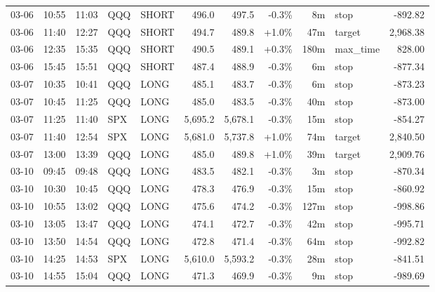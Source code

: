 \documentclass[11pt,a4paper,twoside]{article}
\begin{document}
\begin{center}
\begin{longtable}{>{\color{txtmain}}l l l l l r r r r >{\color{txtmain}}l r}
03-06 & 10:55 & 11:03 & QQQ & SHORT & 496.0 & 497.5 & \textcolor{lossred}{-0.3\%} & 8m & stop & \textcolor{lossred}{-892.82} \\
03-06 & 11:40 & 12:27 & QQQ & SHORT & 494.7 & 489.8 & \textcolor{wingreen}{+1.0\%} & 47m & target & \textcolor{wingreen}{2,968.38} \\
03-06 & 12:35 & 15:35 & QQQ & SHORT & 490.5 & 489.1 & \textcolor{wingreen}{+0.3\%} & 180m & max\_time & \textcolor{wingreen}{828.00} \\
03-06 & 15:45 & 15:51 & QQQ & SHORT & 487.4 & 488.9 & \textcolor{lossred}{-0.3\%} & 6m & stop & \textcolor{lossred}{-877.34} \\
03-07 & 10:35 & 10:41 & QQQ & LONG & 485.1 & 483.7 & \textcolor{lossred}{-0.3\%} & 6m & stop & \textcolor{lossred}{-873.23} \\
03-07 & 10:45 & 11:25 & QQQ & LONG & 485.0 & 483.5 & \textcolor{lossred}{-0.3\%} & 40m & stop & \textcolor{lossred}{-873.00} \\
03-07 & 11:25 & 11:40 & SPX & LONG & 5,695.2 & 5,678.1 & \textcolor{lossred}{-0.3\%} & 15m & stop & \textcolor{lossred}{-854.27} \\
03-07 & 11:40 & 12:54 & SPX & LONG & 5,681.0 & 5,737.8 & \textcolor{wingreen}{+1.0\%} & 74m & target & \textcolor{wingreen}{2,840.50} \\
03-07 & 13:00 & 13:39 & QQQ & LONG & 485.0 & 489.8 & \textcolor{wingreen}{+1.0\%} & 39m & target & \textcolor{wingreen}{2,909.76} \\
03-10 & 09:45 & 09:48 & QQQ & LONG & 483.5 & 482.1 & \textcolor{lossred}{-0.3\%} & 3m & stop & \textcolor{lossred}{-870.34} \\
03-10 & 10:30 & 10:45 & QQQ & LONG & 478.3 & 476.9 & \textcolor{lossred}{-0.3\%} & 15m & stop & \textcolor{lossred}{-860.92} \\
03-10 & 10:55 & 13:02 & QQQ & LONG & 475.6 & 474.2 & \textcolor{lossred}{-0.3\%} & 127m & stop & \textcolor{lossred}{-998.86} \\
03-10 & 13:05 & 13:47 & QQQ & LONG & 474.1 & 472.7 & \textcolor{lossred}{-0.3\%} & 42m & stop & \textcolor{lossred}{-995.71} \\
03-10 & 13:50 & 14:54 & QQQ & LONG & 472.8 & 471.4 & \textcolor{lossred}{-0.3\%} & 64m & stop & \textcolor{lossred}{-992.82} \\
03-10 & 14:25 & 14:53 & SPX & LONG & 5,610.0 & 5,593.2 & \textcolor{lossred}{-0.3\%} & 28m & stop & \textcolor{lossred}{-841.51} \\
03-10 & 14:55 & 15:04 & QQQ & LONG & 471.3 & 469.9 & \textcolor{lossred}{-0.3\%} & 9m & stop & \textcolor{lossred}{-989.69} \\

\end{longtable}
\end{center}
\end{document}
